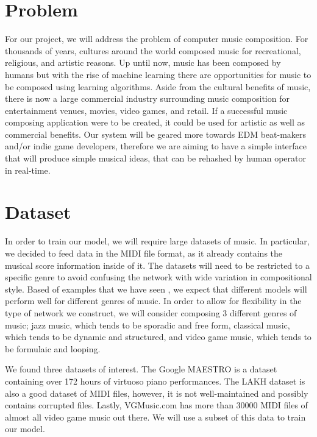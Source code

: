 \documentclass[conference]{IEEEtran}
\begin{document}
\section{Problem}
For our project, we will address the problem of computer music composition. For thousands of years, cultures around the world composed music for recreational, religious, and artistic reasons. Up until now, music has been composed by humans but with the rise of machine learning there are opportunities for music to be composed using learning algorithms. Aside from the cultural benefits of music, there is now a large commercial industry surrounding music composition for entertainment venues, movies, video games, and retail. If a successful music composing application were to be created, it could be used for artistic as well as commercial benefits. Our system will be geared more towards EDM beat-makers and/or indie game developers, therefore we are aiming to have a simple interface that will produce simple musical ideas, that can be rehashed by human operator in real-time.

\section{Dataset}
In order to train our model, we will require large datasets of music. In particular, we decided to feed data in the MIDI file format, as it already contains the musical score information inside of it. The datasets will need to be restricted to a specific genre to avoid confusing the network with wide variation in compositional style. Based of examples that we have seen \cite{ComposerVideo}\cite{JazzVideo}\cite{BaroqueVideo}, we expect that different models will perform well for different genres of music. In order to allow for flexibility in the type of network we construct, we will consider composing 3 different genres of music; jazz music, which tends to be sporadic and free form, classical music, which tends to be dynamic and structured, and video game music, which tends to be formulaic and looping.\par 
We found three datasets of interest. The Google MAESTRO \cite{maestro2018} is a dataset containing over 172 hours of virtuoso piano performances. The LAKH dataset \cite{lakh2011} is also a good dataset of MIDI files, however, it is not well-maintained and possibly contains corrupted files. Lastly, VGMusic.com \cite{vgmusic} has more than 30000 MIDI files of almost all video game music out there. We will use a subset of this data to train our model.
\end{document}
